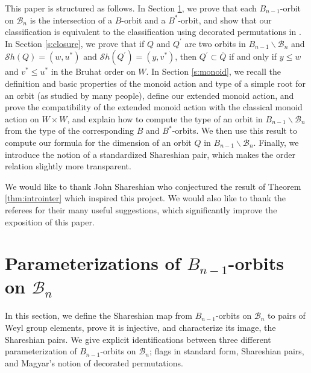 \documentclass[12pt]{amsart}
\numberwithin{equation}{section}
\newcommand{\fl}{\mbox{${\mathfrak l}$}}
\newcommand{\fr}{\mbox{${\mathfrak r}$}}
\newcommand{\B}{\mathcal{B}}
\newcommand{\Borbitspace}{B_{n-1}\backslash\B_{n}}
\newcommand{\Sh}{\mathcal{S}h}
\begin{document}
This paper is structured as follows.  In Section \ref{s:orbitintersect}, we prove that each $B_{n-1}$-orbit on $\B_n$ is the intersection of a $B$-orbit and a 
$B^{*}$-orbit, and show that our classification is equivalent to the classification using decorated permutations in \cite{Magyar}.  In Section \ref{s:closure}, we prove that if $Q$ and $Q^{\prime}$ are two orbits in $\Borbitspace$ and $\Sh(Q)=(w,u^{*})$ and $\Sh(Q^{\prime})=(y,v^{*})$, then $Q^{\prime}\subset \overline{Q}$ if and only if $y\le w$ and $v^{*}\le u^{*}$ in the Bruhat order on $W$.  In 
Section \ref{s:monoid}, we recall the definition and basic properties of the monoid action and type of a simple root for an orbit (as studied by many people), define our extended monoid action, and prove the compatibility of the extended monoid action with the classical monoid action on $W\times W$, and explain how to compute the type of an orbit in $\Borbitspace$ from the type of the corresponding $B$ and $B^{*}$-orbits.  We then use this result to compute our formula for the dimension of an orbit $Q$ in $\Borbitspace$.  Finally, we introduce the notion of a standardized Shareshian pair, which makes the order relation slightly more transparent.

We would like to thank John Shareshian who conjectured the result of Theorem \ref{thm:introinter} which inspired this  project.   We would also like to thank the referees for their many useful suggestions, which significantly improve the exposition of this paper.  








\section{Parameterizations of $B_{n-1}$-orbits on $\B_{n}$}\label{s:orbitintersect}
In this section, we define the Shareshian map from $B_{n-1}$-orbits on $\B_{n}$ to pairs of Weyl group elements, prove it is injective, and characterize its image, the Shareshian pairs.  We give explicit identifications between three different parameterization of $B_{n-1}$-orbits on $\B_{n}$; flags in standard form, Shareshian pairs, and Magyar's notion of decorated permutations. 
\end{document}
